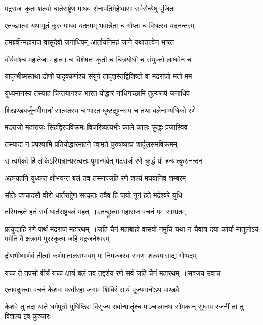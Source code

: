 \twolineshloka
{मद्रराजः कृतः शल्यो धार्तराष्ट्रेण माघव}
{सेनापतिर्महेष्वासः सर्वसैन्येषु पूजितः}


\twolineshloka
{एतज्ज्ञात्वा यथाभूतं कुरु माधव यत्क्षमम्}
{भवान्नेता च गोप्ता च विधत्स्व यदनन्तरम्}


\twolineshloka
{तमब्रवीन्महाराज वासुदेवो जनाधिपम्}
{आर्तायनिमहं जाने यथातत्त्वेन भारत}


\twolineshloka
{वीर्यवांश्च महातेजा महात्मा च विशेषतः}
{कृती च चित्रयोधी च संयुक्तो लाघवेन च}


\twolineshloka
{यादृग्भीष्मस्तथा द्रोणो यादृक्कर्णश्च संयुगे}
{तादृशृस्तद्विशिष्टो वा मद्रराजो मतो मम}


\twolineshloka
{युध्यमानस्य तस्याहं चिन्तयानश्च भारत}
{योद्धारं नाधिगच्छामि तुल्यरूपं जनाधिप}


\twolineshloka
{शिखण़्ड्यर्जुनभीमानां सात्वतस्य च भारत}
{धृष्टद्युम्नस्य च तथा बलेनाभ्यधिको रणे}


\twolineshloka
{मद्रराजो महाराजः सिंहद्विरदविक्रमः}
{विचरिष्यत्यभीः काले कालः क्रुद्धः प्रजास्विव}


\twolineshloka
{तस्याद्य न प्रपश्यामि प्रतियोद्धारमाहने}
{त्वामृते पुरुषव्याघ्र शार्दूलसमविक्रमम्}


\twolineshloka
{स त्वमेको हि लोकेऽस्मिन्नान्यस्त्वत्तः पुमान्भवेत्}
{मद्रराजं रणे क्रुद्धं यो हन्यात्कुरुनन्दन}


\twolineshloka
{अहन्यहनि युध्यन्तं क्षोभयन्तं बलं तव}
{तस्माज्जहि रणे शल्यं मघवानिव शम्बरम्}


\threelineshloka
{सौतेः पश्चादसौ वीरो धार्तराष्ट्रेण सत्कृतः}
{तवैव हि जयो नूनं हते मद्रेश्वरे युधि}
{}


\twolineshloka
{तस्मिन्हते हतं सर्वं धार्तराष्ट्रबलं महत् ॥एतच्छ्रुत्वा महाराज वचनं मम साम्प्रतम्}
{}


प्रत्युद्याहि रणे पार्थ मद्रराजं महारथम् ॥जहि चैनं महाबाहो वासवो नमुचिं यथा
\twolineshloka
{न चैवात्र दया कार्या मातुलोऽयं ममेति वै}
{क्षत्रवर्म पुरस्कृत्य जहि मद्रजनेश्वरम्}


\threelineshloka
{द्रोणभीष्मार्णवं तीर्त्वा कर्णपातालसम्भवम्}
{मा निमज्जस्व सगणः शल्यमासाद्य गोष्पदम्}
{}


\threelineshloka
{यच्च ते तपसो वीर्यं यच्च क्षात्रं बलं तव}
{तद्दर्शय रणे सर्वं जहि चैनं महारथम् ॥सञ्जय उवाच}
{}


\twolineshloka
{एतावदुक्त्वा वचनं केशवः परवीरहा}
{जगाम शिबिरं सायं पूज्यमानोऽथ पाण्डवैः}


\threelineshloka
{केशवे तु तदा याते धर्मपुत्रो युधिष्ठिरः}
{विसृज्य सर्वान्भ्रातॄंश्च पाञ्चालानथ सोमकान्}
{सुष्वाप रजनीं तां तु विशल्य इव कुञ्जरः}


